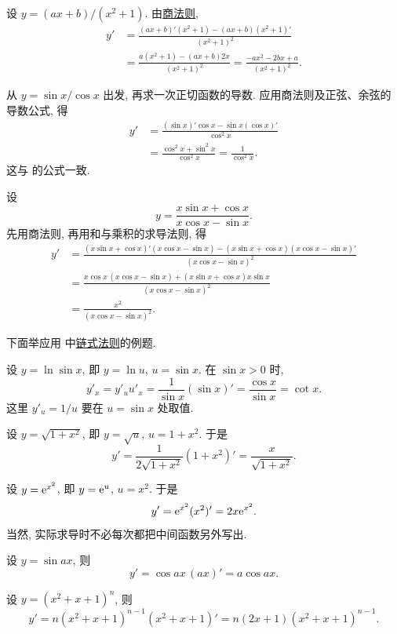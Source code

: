 \label{ex:differentiate_linear_over_quadratic}
设 $y=(ax+b)/(x^2+1)$.
由\hyperref[rule:derivative_quotient]{商法则},
\begin{align*}
y'&=\frac{(ax+b)'(x^2+1)-(ax+b)(x^2+1)'}{(x^2+1)^2}\\
&=\frac{a(x^2+1)-(ax+b)2x}{(x^2+1)^2}
=\frac{-ax^2-2bx+a}{(x^2+1)^2}.
\end{align*}

\label{ex:differentiate_tangent_again}
从 $y=\sin x/\cos x$ 出发, 再求一次正切函数的导数.
应用商法则及正弦、余弦的导数公式, 得
\begin{align*}
y'&=\frac{(\sin x)'\cos x-\sin x(\cos x)'}{\cos^2x}\\
&=\frac{\cos^2x+\sin^2x}{\cos^2x}=\frac1{\cos^2x}.
\end{align*}
这与  的公式一致.

\label{ex:differentiate_trigonometric_quotient}
设
$$
y=\frac{x\sin x+\cos x}{x\cos x-\sin x}.
$$
先用商法则, 再用和与乘积的求导法则, 得
\begin{align*}
y'&=\frac{(x\sin x+\cos x)'(x\cos x-\sin x)
 -(x\sin x+\cos x)(x\cos x-\sin x)'}{(x\cos x-\sin x)^2}\\
&=\frac{x\cos x\,(x\cos x-\sin x)
 +(x\sin x+\cos x)x\sin x}{(x\cos x-\sin x)^2}\\
&=\frac{x^2}{(x\cos x-\sin x)^2}.
\end{align*}

下面举应用  中\hyperref[rule:derivative_composition]{链式法则}的例题.

\label{ex:differentiate_log_sine}
设 $y=\ln\sin x$, 即 $y=\ln u$, $u=\sin x$.
在 $\sin x>0$ 时,
$$
y'_x=y'_u u'_x=\frac1{\sin x}(\sin x)'
=\frac{\cos x}{\sin x}=\cot x.
$$
这里 $y'_u=1/u$ 要在 $u=\sin x$ 处取值.

\label{ex:differentiate_sqrt_one_plus_square}
设 $y=\sqrt{1+x^2}$, 即 $y=\sqrt u$, $u=1+x^2$.
于是
$$
y' =\frac1{2\sqrt{1+x^2}}(1+x^2)'
=\frac{x}{\sqrt{1+x^2}}.
$$

\label{ex:differentiate_exp_square}
设 $y=\mathrm{e}^{x^2}$, 即 $y=\mathrm{e}^u$, $u=x^2$.
于是
$$
y'=\mathrm{e}^{x^2}(x^2)'=2x\mathrm{e}^{x^2}.
$$
当然, 实际求导时不必每次都把中间函数另外写出.

\label{ex:differentiate_sine_ax}
设 $y=\sin ax$, 则
$$
y'=\cos ax\,(ax)'=a\cos ax.
$$

\label{ex:differentiate_polynomial_power}
设 $y=(x^2+x+1)^n$, 则
$$
y'=n(x^2+x+1)^{n-1}(x^2+x+1)'
=n(2x+1)(x^2+x+1)^{n-1}.
$$

